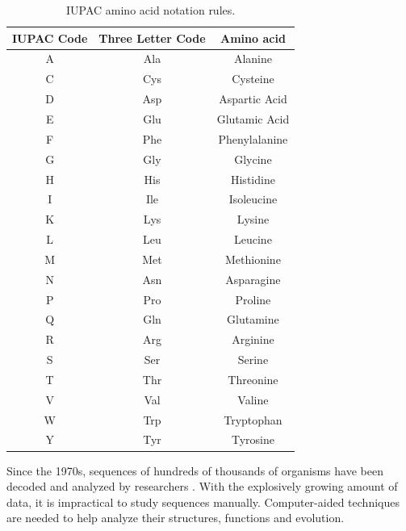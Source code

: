 \begin{table}[hbt]
\centering\small
\caption[IUPAC Amino Acid Notation Rules]{IUPAC amino acid notation rules.}\label{tab:code-aa}
\begin{tabular}{ccc} \toprule
  IUPAC Code  & Three Letter Code & Amino acid    \\ \hline
  A           & Ala               & Alanine       \\
  C           & Cys               & Cysteine      \\
  D           & Asp               & Aspartic Acid \\
  E           & Glu               & Glutamic Acid \\
  F           & Phe               & Phenylalanine \\
  G           & Gly               & Glycine       \\
  H           & His               & Histidine     \\
  I           & Ile               & Isoleucine    \\
  K           & Lys               & Lysine        \\
  L           & Leu               & Leucine       \\
  M           & Met               & Methionine    \\
  N           & Asn               & Asparagine    \\
  P           & Pro               & Proline       \\
  Q           & Gln               & Glutamine     \\
  R           & Arg               & Arginine      \\
  S           & Ser               & Serine        \\
  T           & Thr               & Threonine     \\
  V           & Val               & Valine        \\
  W           & Trp               & Tryptophan    \\
  Y           & Tyr               & Tyrosine      \\ \bottomrule
\end{tabular}
\end{table}

Since the 1970s, sequences of hundreds of thousands of organisms have been decoded and analyzed by researchers \cite{Benson:2007lr}. With the explosively growing amount of data, it is impractical to study sequences manually. Computer-aided techniques are needed to help analyze their structures, functions and evolution.

